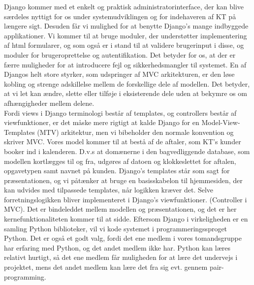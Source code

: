 \documentclass[12pt]{article}   %
\begin{document}
Django kommer med et enkelt og praktisk administratorinterface, der kan blive
særdeles nyttigt for os under systemudviklingen og for indehaveren af KT på
længere sigt. Desuden får vi mulighed for at benytte Django's mange indbyggede 
applikationer. Vi kommer til at bruge moduler, der understøtter implementering af
html formularer, og som også er i stand til at validere brugerinput i disse,
og moduler for brugeroprettelse og autentifikation. Det betyder for os, at der er
færre muligheder for at introducere fejl og sikkerhedsmangler til
systemet. En af Djangos helt store styrker, som udspringer af MVC arkitekturen,
er den løse kobling og strenge adskillelse mellem de forskellige dele af modellen.
Det betyder, at vi let kan ændre, slette eller tilføje i eksisterende dele uden at
bekymre os om afhængigheder mellem delene. \\
Fordi views i Django terminologi består af templates, og controllers består af
viewfunktioner, er det måske mere rigtigt at kalde Django for en Model-View-Templates
(MTV) arkitektur, men vi bibeholder den normale konvention og skriver MVC. Vores
model kommer til at bestå af de aftaler, som KT's kunder booker ind i kalenderen.
D.v.s at domænerne i den bagvedliggende database, som modellen kortlægges til og 
fra, udgøres af datoen og klokkeslettet for aftalen, opgavetypen samt navnet
på kunden. Django's templates står som sagt for præsentationen, og vi
påtænker at bruge en basisskabelon til hjemmesiden, der kan udvides med
tilpassede templates, når logikken kræver det. Selve forretningslogikken bliver 
implementeret i Django's viewfunktioner. (Controller i MVC). Det er bindeleddet
mellem modellen og præsentationen, og det er her kernefunktionaliteten kommer til at 
sidde. Eftersom Django i virkeligheden er en samling Python biblioteker, vil vi kode 
systemet i programmeringssproget Python. Det er også et godt valg, fordi det ene
medlem i vores tomandsgruppe har erfaring med Python, og det andet medlem ikke har.
Python kan læres relativt hurtigt, så det ene medlem får muligheden for at
lære det undervejs i projektet, mens det andet medlem kan lære det fra sig
evt. gennem pair-programming. \\ 
\end{document}
